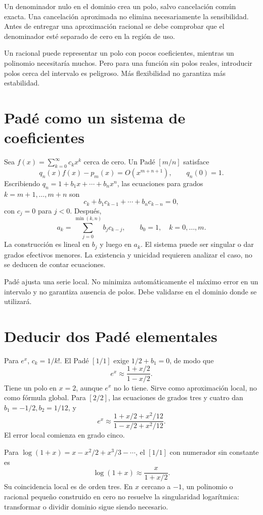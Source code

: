 \documentclass[11pt,a4paper]{article}
\theoremstyle{definition}
\begin{document}
Un denominador nulo en el dominio crea un polo, salvo cancelación común exacta. Una cancelación aproximada no elimina necesariamente la sensibilidad. Antes de entregar una aproximación racional se debe comprobar que el denominador esté separado de cero en la región de uso.

Un racional puede representar un polo con pocos coeficientes, mientras un polinomio necesitaría muchos. Pero para una función sin polos reales, introducir polos cerca del intervalo es peligroso. Más flexibilidad no garantiza más estabilidad.

\section{Padé como un sistema de coeficientes}
Sea $f(x)=\sum_{k=0}^\infty c_kx^k$ cerca de cero. Un Padé $[m/n]$ satisface
\[
q_n(x)f(x)-p_m(x)=O(x^{m+n+1}),\qquad q_n(0)=1.
\]
Escribiendo $q_n=1+b_1x+\cdots+b_nx^n$, las ecuaciones para grados $k=m+1,\ldots,m+n$ son
\[
c_k+b_1c_{k-1}+\cdots+b_nc_{k-n}=0,
\]
con $c_j=0$ para $j<0$. Después,
\[
a_k=\sum_{j=0}^{\min(k,n)}b_jc_{k-j},\qquad b_0=1,\quad k=0,\ldots,m.
\]
La construcción es lineal en $b_j$ y luego en $a_k$. El sistema puede ser singular o dar grados efectivos menores. La existencia y unicidad requieren analizar el caso, no se deducen de contar ecuaciones.

Padé ajusta una serie local. No minimiza automáticamente el máximo error en un intervalo y no garantiza ausencia de polos. Debe validarse en el dominio donde se utilizará.

\section{Deducir dos Padé elementales}
Para $e^x$, $c_k=1/k!$. El Padé $[1/1]$ exige $1/2+b_1=0$, de modo que
\[
e^x\approx\frac{1+x/2}{1-x/2}.
\]
Tiene un polo en $x=2$, aunque $e^x$ no lo tiene. Sirve como aproximación local, no como fórmula global. Para $[2/2]$, las ecuaciones de grados tres y cuatro dan $b_1=-1/2,b_2=1/12$, y
\[
e^x\approx\frac{1+x/2+x^2/12}{1-x/2+x^2/12}.
\]
El error local comienza en grado cinco.

Para $\log(1+x)=x-x^2/2+x^3/3-\cdots$, el $[1/1]$ con numerador sin constante es
\[
\log(1+x)\approx\frac{x}{1+x/2}.
\]
Su coincidencia local es de orden tres. En $x$ cercano a $-1$, un polinomio o racional pequeño construido en cero no resuelve la singularidad logarítmica: transformar o dividir dominio sigue siendo necesario.
\end{document}
